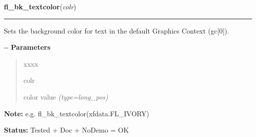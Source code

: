 \hspace{.8\funcindent}\begin{boxedminipage}{\funcwidth}

    \raggedright \textbf{fl\_bk\_textcolor}(\textit{colr})

    \vspace{-1.5ex}

    \rule{\textwidth}{0.5\fboxrule}
\setlength{\parskip}{2ex}

Sets the background color for text in the default Graphics Context
(gc{[}0{]}).

-{}-
\setlength{\parskip}{1ex}
      \textbf{Parameters}
      \vspace{-1ex}

      \begin{quote}
        \begin{Ventry}{xxxx}

          \item[colr]


color value
            {\it (type=long\_pos)}

        \end{Ventry}

      \end{quote}

\textbf{Note:} 
e.g. fl\_bk\_textcolor(xfdata.FL\_IVORY)


\textbf{Status:} 
Tested + Doc + NoDemo = OK


    \end{boxedminipage}

    \label{xformslib:flbasic:fl_set_gamma}

    \vspace{0.5ex}

